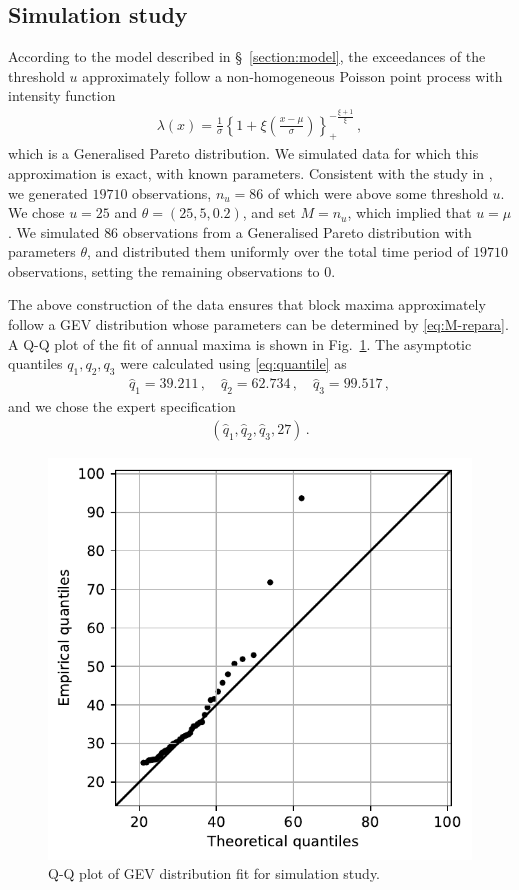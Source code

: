 \documentclass{article}
\begin{document}
\subsection{Simulation study}
%

%
According to the model described in \S~\ref{section:model},
the exceedances of the threshold $u$ approximately
follow a non-homogeneous Poisson point process with intensity function
%
\begin{align*}
	\lambda(x) = \frac{1}{\sigma}
		\left\{1 + \xi \left(\frac{x - \mu}{\sigma}\right)\right\}_+
		^ {-\frac{\xi + 1}{\xi}} \,,
\end{align*}
%
which is a Generalised Pareto distribution.
We simulated data for which this approximation is exact,
with known parameters.
Consistent with the study in \cite{coles1996},
we generated $19710$ observations, $n_u = 86$ of which were above
some threshold $u$. We chose $u = 25$ and $\theta = (25, 5, 0.2)$,
and set $M = n_u$, which implied that $u = \mu$.
We simulated $86$ observations from a
Generalised Pareto distribution with parameters $\theta$,
and distributed them uniformly
over the total time period of $19710$ observations,
setting the remaining observations to $0$.
%

%
The above construction of the data ensures that block maxima approximately
follow a GEV distribution whose parameters can be determined
by \eqref{eq:M-repara}.
A Q-Q plot of the fit of annual maxima is shown in Fig.~\ref{fig:ppp-qq}.
%
The asymptotic quantiles $q_1, q_2, q_3$ were calculated
using \eqref{eq:quantile} as
%
\begin{align*}
	\hat{q}_1 = 39.211 \,,
	\quad \hat{q}_2 = 62.734 \,,
	\quad \hat{q}_3 = 99.517 \,,
\end{align*}
%
and we chose the expert specification
%
\begin{align*}
	\left(\hat{q}_1, \hat{q}_2, \hat{q}_3, 27 \right) \,.
\end{align*}
%
\begin{figure}[h]
	\centering
	\includegraphics[width=0.55\linewidth]{plots/ppp-qq.pdf}
	\caption{Q-Q plot of GEV distribution fit for simulation study.}
	\label{fig:ppp-qq}
\end{figure}
%
\end{document}
